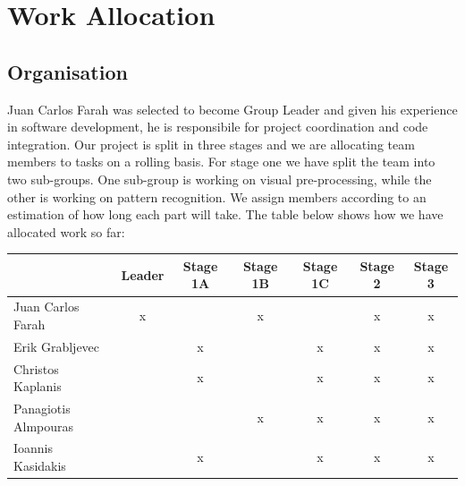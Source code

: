 \documentclass[a4paper,11pt]{article}
\begin{document}

\section{Work Allocation}

\subsection{Organisation}

Juan Carlos Farah was selected to become Group Leader and given his experience in software development, he is responsibile for project coordination and code integration. Our project is split in three stages and we are allocating team members to tasks on a rolling basis. For stage one we have split the team into two sub-groups. One sub-group is working on visual pre-processing, while the other is working on pattern recognition. We assign members according to an estimation of how long each part will take. The table below shows how we have allocated work so far:

\begin{table}[ht]

\centering %

\begin{tabular}{l c c c c c c} %


& Leader & Stage 1A & Stage 1B & Stage 1C & Stage 2 & Stage 3\\ [0.5ex] %


\hline %

Juan Carlos Farah & x & & x &  & x & x \\ %

Erik Grabljevec & & x & & x & x & x \\

Christos Kaplanis & & x & & x & x & x \\

Panagiotis Almpouras & & & x & x & x & x \\

Ioannis Kasidakis & & x & & x & x & x \\ [1ex] %

\end{tabular}

\label{table:nonlin} %

\end{table}
\end{document}
